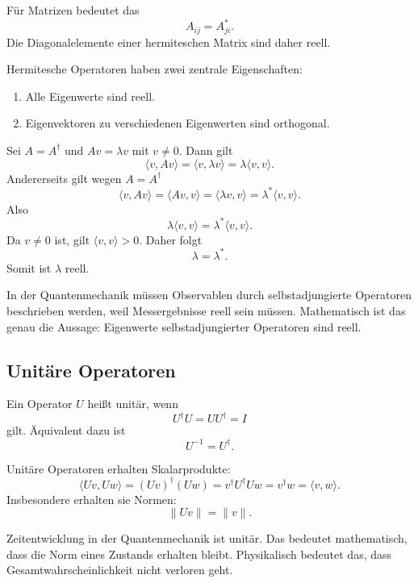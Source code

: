 Für Matrizen bedeutet das
\[
    A_{ij}=A_{ji}^*.
\]
Die Diagonalelemente einer hermiteschen Matrix sind daher reell.

\begin{formulabox}
Hermitesche Operatoren haben zwei zentrale Eigenschaften:
\begin{enumerate}[label=\arabic*)]
    \item Alle Eigenwerte sind reell.
    \item Eigenvektoren zu verschiedenen Eigenwerten sind orthogonal.
\end{enumerate}
\end{formulabox}

\begin{derivationbox}
Sei $A=A^\dagger$ und $Av=\lambda v$ mit $v\ne0$. Dann gilt
\[
    \langle v,Av\rangle = \langle v,\lambda v\rangle=\lambda\langle v,v\rangle.
\]
Andererseits gilt wegen $A=A^\dagger$
\[
    \langle v,Av\rangle = \langle A v,v\rangle = \langle \lambda v,v\rangle = \lambda^*\langle v,v\rangle.
\]
Also
\[
    \lambda\langle v,v\rangle=\lambda^*\langle v,v\rangle.
\]
Da $v\ne0$ ist, gilt $\langle v,v\rangle>0$. Daher folgt
\[
    \lambda=\lambda^*.
\]
Somit ist $\lambda$ reell.
\end{derivationbox}

\begin{examtipbox}
In der Quantenmechanik müssen Observablen durch selbstadjungierte Operatoren beschrieben werden, weil Messergebnisse reell sein müssen. Mathematisch ist das genau die Aussage: Eigenwerte selbstadjungierter Operatoren sind reell.
\end{examtipbox}

\subsection{Unitäre Operatoren}

\begin{definitionbox}
Ein Operator $U$ heißt unitär, wenn
\[
    U^\dagger U=UU^\dagger=I
\]
gilt. Äquivalent dazu ist
\[
    U^{-1}=U^\dagger.
\]
\end{definitionbox}

Unitäre Operatoren erhalten Skalarprodukte:
\[
    \langle Uv,Uw\rangle
    = (Uv)^\dagger(Uw)
    = v^\dagger U^\dagger U w
    = v^\dagger w
    = \langle v,w\rangle.
\]
Insbesondere erhalten sie Normen:
\[
    \|Uv\|=\|v\|.
\]

\begin{conceptbox}
Zeitentwicklung in der Quantenmechanik ist unitär. Das bedeutet mathematisch, dass die Norm eines Zustands erhalten bleibt. Physikalisch bedeutet das, dass Gesamtwahrscheinlichkeit nicht verloren geht.
\end{conceptbox}

